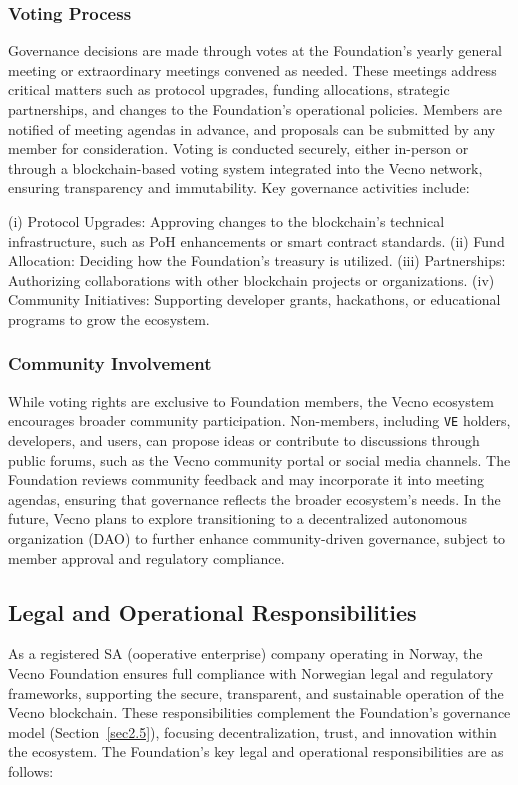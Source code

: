 \documentclass[a4paper,onecolumn,superscriptaddress,10pt]{compositionalityarticle}
\begin{document}
\subsubsection{Voting Process}
Governance decisions are made through votes at the Foundation’s yearly general meeting or extraordinary meetings convened as needed. These meetings address critical matters such as protocol upgrades, funding allocations, strategic partnerships, and changes to the Foundation’s operational policies. Members are notified of meeting agendas in advance, and proposals can be submitted by any member for consideration. Voting is conducted securely, either in-person or through a blockchain-based voting system integrated into the Vecno network, ensuring transparency and immutability. Key governance activities include:

{(i) Protocol Upgrades}: Approving changes to the blockchain’s technical infrastructure, such as PoH enhancements or smart contract standards. {(ii) Fund Allocation}: Deciding how the Foundation’s treasury is utilized. {(iii) Partnerships}: Authorizing collaborations with other blockchain projects or organizations. {(iv) Community Initiatives}: Supporting developer grants, hackathons, or educational programs to grow the ecosystem.

\subsubsection{Community Involvement}
While voting rights are exclusive to Foundation members, the Vecno ecosystem encourages broader community participation. Non-members, including \texttt{VE} holders, developers, and users, can propose ideas or contribute to discussions through public forums, such as the Vecno community portal or social media channels. The Foundation reviews community feedback and may incorporate it into meeting agendas, ensuring that governance reflects the broader ecosystem’s needs. In the future, Vecno plans to explore transitioning to a decentralized autonomous organization (DAO) to further enhance community-driven governance, subject to member approval and regulatory compliance.

\subsection{Legal and Operational Responsibilities}\label{sec1.6}

As a registered SA (ooperative enterprise) company operating in Norway, the Vecno Foundation ensures full compliance with Norwegian legal and regulatory frameworks, supporting the secure, transparent, and sustainable operation of the Vecno blockchain. These responsibilities complement the Foundation’s governance model (Section~\ref{sec2.5}), focusing decentralization, trust, and innovation within the ecosystem. The Foundation’s key legal and operational responsibilities are as follows:
\end{document}
